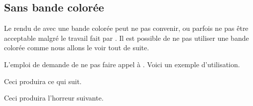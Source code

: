 \documentclass{../main/main}
\begin{document}
\subsection{Sans bande colorée}

Le rendu de  avec une bande colorée peut ne pas convenir, ou parfois ne pas être acceptable malgré le travail fait par .
Il est possible de ne pas utiliser une bande colorée comme nous allons le voir tout de suite.


\begin{tdocexa}
    L'emploi de  demande de ne pas faire appel à .
    Voici un exemple d'utilisation.


    Ceci produira ce qui suit.

    \medskip

    
\end{tdocexa}


\begin{tdocexa}
    \leavevmode


    Ceci produira l'horreur suivante.

    \medskip

    
\end{tdocexa}
\end{document}

